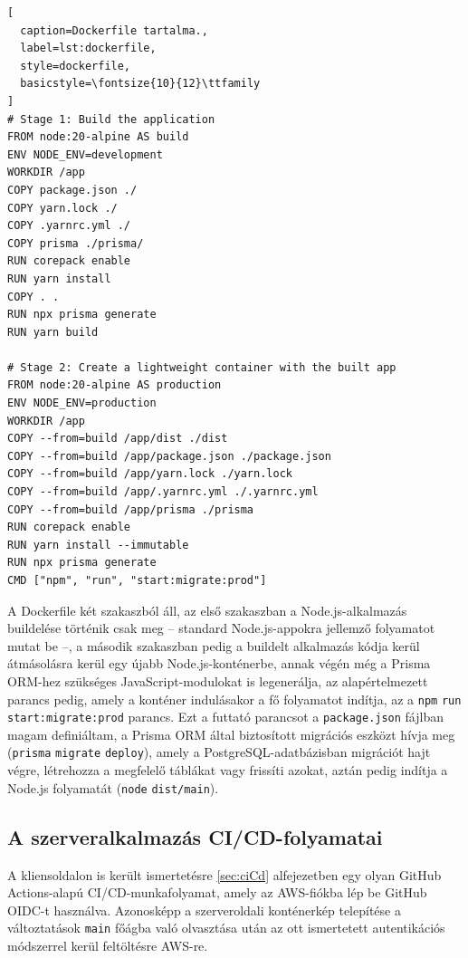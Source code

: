 \begin{minipage}{0.92\textwidth}
  \begin{lstlisting}[
  caption=Dockerfile tartalma.,
  label=lst:dockerfile,
  style=dockerfile,
  basicstyle=\fontsize{10}{12}\ttfamily
]
# Stage 1: Build the application
FROM node:20-alpine AS build
ENV NODE_ENV=development
WORKDIR /app
COPY package.json ./
COPY yarn.lock ./
COPY .yarnrc.yml ./
COPY prisma ./prisma/
RUN corepack enable
RUN yarn install
COPY . .
RUN npx prisma generate
RUN yarn build

# Stage 2: Create a lightweight container with the built app
FROM node:20-alpine AS production
ENV NODE_ENV=production
WORKDIR /app
COPY --from=build /app/dist ./dist
COPY --from=build /app/package.json ./package.json
COPY --from=build /app/yarn.lock ./yarn.lock
COPY --from=build /app/.yarnrc.yml ./.yarnrc.yml
COPY --from=build /app/prisma ./prisma
RUN corepack enable
RUN yarn install --immutable
RUN npx prisma generate
CMD ["npm", "run", "start:migrate:prod"]
\end{lstlisting}
\end{minipage}

A Dockerfile két szakaszból áll, az első szakaszban a Node.js-alkalmazás buildelése történik csak meg -- standard Node.js-appokra jellemző folyamatot mutat be --, a második szakaszban pedig a buildelt alkalmazás kódja kerül átmásolásra kerül egy újabb Node.js-konténerbe, annak végén még a Prisma ORM-hez szükséges JavaScript-modulokat is legenerálja, az alapértelmezett parancs pedig, amely a konténer indulásakor a fő folyamatot indítja, az a \verb|npm| \verb|run| \verb|start:migrate:prod| parancs. Ezt a futtató parancsot a \verb|package.json| fájlban magam definiáltam, a Prisma ORM által biztosított migrációs eszközt hívja meg (\verb|prisma| \verb|migrate| \verb|deploy|), amely a PostgreSQL-adatbázisban migrációt hajt végre, létrehozza a megfelelő táblákat vagy frissíti azokat, aztán pedig indítja a Node.js folyamatát (\verb|node| \verb|dist/main|).

\subsection{A szerveralkalmazás CI/CD-folyamatai}

A kliensoldalon is került ismertetésre \ref{sec:ciCd} alfejezetben egy olyan GitHub Actions-alapú CI/CD-munkafolyamat, amely az AWS-fiókba lép be GitHub OIDC-t használva. Azonosképp a szerveroldali konténerkép telepítése a változtatások \verb|main| főágba való olvasztása után az ott ismertetett autentikációs módszerrel kerül feltöltésre AWS-re.

